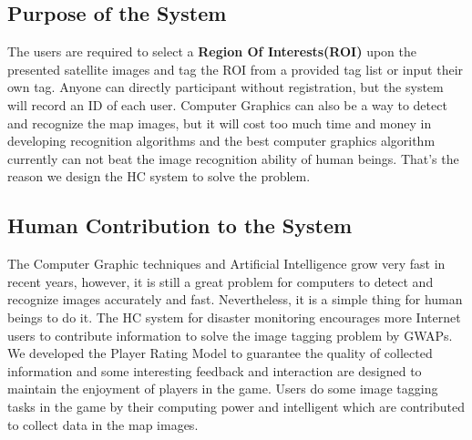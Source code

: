 \subsection{Purpose of the System}
The users are required to select a \textbf{Region Of Interests(ROI)} upon the presented satellite images 
and tag the ROI from a provided tag list or input their own tag. Anyone can directly participant 
without registration, but the system will record an ID of each user.
Computer Graphics can also be a way to detect and recognize the map images, but it will cost 
too much time and money in developing recognition algorithms and the best 
computer graphics algorithm currently can not beat the image recognition ability of human beings. 
That's the reason we design the HC system to solve the problem.

\subsection{Human Contribution to the System}
The Computer Graphic techniques and Artificial Intelligence grow very fast in recent years, 
however, it is still a great problem for computers to detect and recognize images accurately and fast.
Nevertheless, it is a simple thing for human beings to do it.
The HC system for disaster monitoring encourages more Internet users to contribute information 
to solve the image tagging problem by GWAPs. 
We developed the Player Rating Model to guarantee the quality of collected information 
and some interesting feedback and interaction are designed to maintain the enjoyment of players in the game.
Users do some image tagging tasks in the game by their computing power and intelligent 
which are contributed to collect data in the map images.

